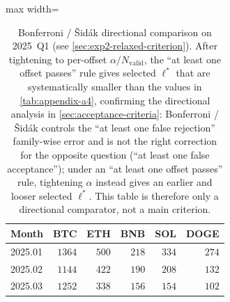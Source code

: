 \documentclass[11pt,titlepage,openany,oneside]{book}  %
\begin{document}
\begin{table}[!htbp]
  \caption[Bonferroni / \v{S}id\'ak directional comparison]{Bonferroni / \v{S}id\'ak directional comparison on 2025~Q1 (see \cref{sec:exp2-relaxed-criterion}). After tightening to per-offset $\alpha / N_{\text{valid}}$, the ``at least one offset passes'' rule gives selected $\ell^*$ that are systematically smaller than the values in \cref{tab:appendix-a4}, confirming the directional analysis in \cref{sec:acceptance-criteria}: Bonferroni / \v{S}id\'ak controls the ``at least one false rejection'' family-wise error and is not the right correction for the opposite question (``at least one false acceptance''); under an ``at least one offset passes'' rule, tightening $\alpha$ instead gives an earlier and looser selected $\ell^*$. This table is therefore only a directional comparator, not a main criterion.}
  \label{tab:appendix-a5}
  \begin{center}
    \begin{adjustbox}{max width=\textwidth}
    \begin{tabular}{lrrrrr}
      \toprule
      Month   & BTC    & ETH   & BNB   & SOL   & DOGE  \\
      \midrule
      2025.01 & $1364$ & $500$ & $218$ & $334$ & $274$ \\
      2025.02 & $1144$ & $422$ & $190$ & $208$ & $132$ \\
      2025.03 & $1252$ & $338$ & $156$ & $154$ & $102$ \\
      \bottomrule
    \end{tabular}
    \end{adjustbox}
  \end{center}
\end{table}
\end{document}
